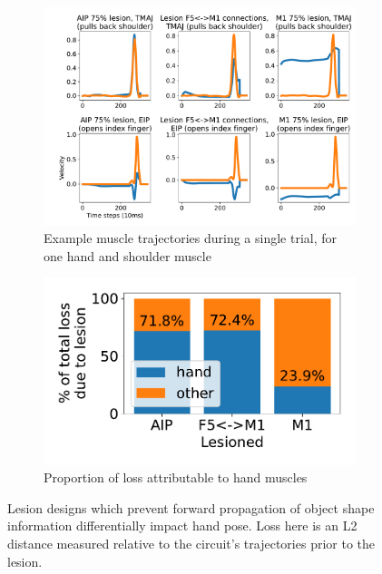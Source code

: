 \documentclass[12pt]{iopart}
\begin{document}
\begin{figure}[h]
	\centering
	\begin{subfigure}[c]{0.62\textwidth}
	    \centering
	    \includegraphics[width=\textwidth]{lesion_trajs.pdf}
	    \caption{Example muscle trajectories during a single trial, for one hand and shoulder muscle}
	\end{subfigure}
	\hfill
	\begin{subfigure}[c]{0.32\textwidth}
	    \centering
	    \includegraphics[width=\textwidth]{lesion_hand.pdf}
	    \caption{Proportion of loss attributable to hand muscles}
	\end{subfigure}
	\hfill
	\caption{Lesion designs which prevent forward propagation of object shape information
	         differentially impact hand pose. Loss here is an L2 distance
		 measured relative to the circuit's trajectories prior to the lesion.}
	\label{fig:lesion}
\end{figure}
\end{document}
